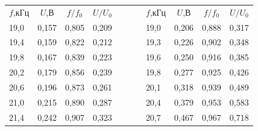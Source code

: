 \documentclass{article}
\begin{document}
\begin{center}

    \begin{tabular}{|l|l|l|l|lllllll}
    \cline{1-4} \cline{8-11}
    \multicolumn{1}{|c|}{$f$,кГц} & \multicolumn{1}{c|}{$U$,В} & \multicolumn{1}{c|}{$f/f_0$} & \multicolumn{1}{c|}{$U/U_0$} &  &  & \multicolumn{1}{l|}{} & \multicolumn{1}{c|}{$f$,кГц} & \multicolumn{1}{c|}{$U$,В}   & \multicolumn{1}{c|}{$f/f_0$} & \multicolumn{1}{c|}{$U/U_0$} \\ \cline{1-4} \cline{8-11} 
    19,0                        & 0,157                    & 0,805                       & 0,209                       &  &  & \multicolumn{1}{l|}{} & \multicolumn{1}{l|}{19,0}  & \multicolumn{1}{l|}{0,206} & \multicolumn{1}{l|}{0,888}  & \multicolumn{1}{l|}{0,317}  \\ \cline{1-4} \cline{8-11} 
    19,4                        & 0,159                    & 0,822                       & 0,212                       &  &  & \multicolumn{1}{l|}{} & \multicolumn{1}{l|}{19,3}  & \multicolumn{1}{l|}{0,226} & \multicolumn{1}{l|}{0,902}  & \multicolumn{1}{l|}{0,348}  \\ \cline{1-4} \cline{8-11} 
    19,8                        & 0,167                    & 0,839                       & 0,223                       &  &  & \multicolumn{1}{l|}{} & \multicolumn{1}{l|}{19,6}  & \multicolumn{1}{l|}{0,250} & \multicolumn{1}{l|}{0,916}  & \multicolumn{1}{l|}{0,385}  \\ \cline{1-4} \cline{8-11} 
    20,2                        & 0,179                    & 0,856                       & 0,239                       &  &  & \multicolumn{1}{l|}{} & \multicolumn{1}{l|}{19,8}  & \multicolumn{1}{l|}{0,277} & \multicolumn{1}{l|}{0,925}  & \multicolumn{1}{l|}{0,426}  \\ \cline{1-4} \cline{8-11} 
    20,6                        & 0,196                    & 0,873                       & 0,261                       &  &  & \multicolumn{1}{l|}{} & \multicolumn{1}{l|}{20,1}  & \multicolumn{1}{l|}{0,318} & \multicolumn{1}{l|}{0,939}  & \multicolumn{1}{l|}{0,489}  \\ \cline{1-4} \cline{8-11} 
    21,0                        & 0,215                    & 0,890                       & 0,287                       &  &  & \multicolumn{1}{l|}{} & \multicolumn{1}{l|}{20,4}  & \multicolumn{1}{l|}{0,379} & \multicolumn{1}{l|}{0,953}  & \multicolumn{1}{l|}{0,583}  \\ \cline{1-4} \cline{8-11} 
    21,4                        & 0,242                    & 0,907                       & 0,323                       &  &  & \multicolumn{1}{l|}{} & \multicolumn{1}{l|}{20,7}  & \multicolumn{1}{l|}{0,467} & \multicolumn{1}{l|}{0,967}  & \multicolumn{1}{l|}{0,718}  \\ \cline{1-4} \cline{8-11} 

\end{tabular}
\end{center}
\end{document}
